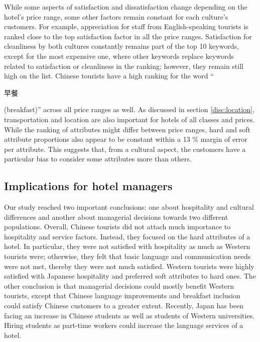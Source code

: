 \documentclass[smallextended,natbib]{svjour3}       %
\begin{document}
    While some aspects of satisfaction and dissatisfaction change depending on the hotel's price range, some other factors remain constant for each culture's customers. For example, appreciation for staff from English-speaking tourists is ranked close to the top satisfaction factor in all the price ranges. Satisfaction for cleanliness by both cultures constantly remains part of the top 10 keywords, except for the most expensive one, where other keywords replace keywords related to satisfaction or cleanliness in the ranking; however, they remain still high on the list. Chinese tourists have a high ranking for the word ``\begin{CJK}{UTF8}{gbsn}早餐\end{CJK} (breakfast)'' across all price ranges as well. As discussed in section \ref{disc:location}, transportation and location are also important for hotels of all classes and prices. While the ranking of attributes might differ between price ranges, hard and soft attribute proportions also appear to be constant within a 13 \% margin of error per attribute. This suggests that, from a cultural aspect, the customers have a particular bias to consider some attributes more than others.

  \subsection{Implications for hotel managers}\label{disc:implications}

    Our study reached two important conclusions: one about hospitality and cultural differences and another about managerial decisions towards two different populations. Overall, Chinese tourists did not attach much importance to hospitality and service factors. Instead, they focused on the hard attributes of a hotel. In particular, they were not satisfied with hospitality as much as Western tourists were; otherwise, they felt that basic language and communication needs were not met, thereby they were not much satisfied. Western tourists were highly satisfied with Japanese hospitality and preferred soft attributes to hard ones. The other conclusion is that managerial decisions could mostly benefit Western tourists, except that Chinese language improvements and breakfast inclusion could satisfy Chinese customers to a greater extent. Recently, Japan has been facing an increase in Chinese students as well as students of Western universities. Hiring students as part-time workers could increase the language services of a hotel.
\end{document}
